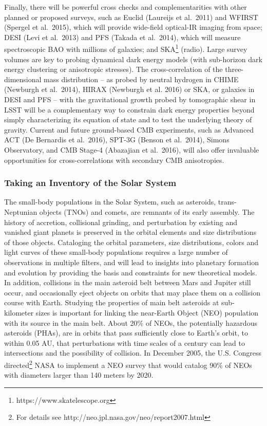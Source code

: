 Finally, there will be powerful cross checks and complementarities with other planned or
proposed surveys, such as Euclid (Laureijs et al.~2011) and WFIRST
(Spergel et al.~2015), which will provide
wide-field optical-IR imaging from space;
DESI (Levi et al.~2013)
and PFS (Takada et al.~2014), which will measure
spectroscopic BAO with
millions of galaxies; and SKA\footnote{https://www.skatelescope.org} (radio).
Large survey volumes are key to probing dynamical dark energy models (with sub-horizon
dark energy clustering or anisotropic stresses). The cross-correlation
of the three-dimensional
mass distribution -- as probed by neutral hydrogen in CHIME (Newburgh et al.~2014), HIRAX (Newburgh
et al. 2016) or SKA, or galaxies in DESI and PFS -- with the gravitational growth
probed by tomographic shear in LSST will be a complementary way to constrain dark energy
properties beyond simply characterizing its equation of state and to test the underlying theory of gravity.
Current and future ground-based CMB experiments, such as Advanced ACT (De Bernardis et al.~2016),
SPT-3G (Benson et al.~2014), Simons Observatory, and CMB Stage-4 (Abazajian et al.~2016), will also offer invaluable opportunities for
cross-correlations with secondary CMB anisotropies.



\subsubsection{Taking an Inventory of the Solar System}


The small-body populations in the Solar System, such as asteroids, trans-Neptunian objects (TNOs)
and comets, are remnants of its early assembly. The history of accretion, collisional grinding, and
perturbation by existing and vanished giant planets is preserved in the orbital elements and size
distributions of those objects. Cataloging the orbital parameters, size distributions, colors and light
curves of these small-body populations requires a large number of observations in multiple filters,
and will lead to insights into planetary formation and evolution by providing the basis and constraints
for new theoretical models. In addition, collisions in the main asteroid belt between Mars and Jupiter
still occur, and occasionally eject objects on orbits that may place them on a collision course with Earth.
Studying the properties of main belt asteroids at sub-kilometer sizes is important for linking the near-Earth
Object (NEO) population with its source in the main belt. About 20\% of NEOs, the potentially hazardous
asteroids (PHAs), are in orbits that pass sufficiently close to Earth's orbit, to within 0.05 AU, that perturbations
with time scales of a century can lead to intersections and the possibility of collision. In December 2005,
the U.S. Congress directed\footnote{For details see http://neo.jpl.nasa.gov/neo/report2007.html} NASA to
implement a NEO survey that would catalog 90\% of NEOs with diameters larger than 140 meters by 2020.

